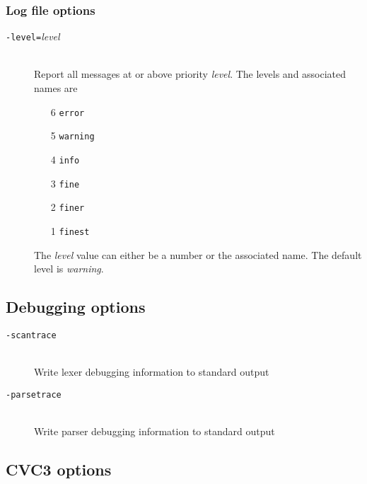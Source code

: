 \documentclass[12pt,fleqn]{article}
\newcommand{\optionb}[1]{\item[\texttt{-{#1}}]\ \\}
\newcommand{\optionv}[2]{\item[\texttt{-{#1}=}\mdseries\textit{#2}]\ \\}
\begin{document}
\subsubsection{Log file options}

\begin{description}
  \optionv{level}{level}  Report all messages at or above 
     priority \textit{level}.  The levels and associated names are
     \begin{enumerate}
     \item [6] \texttt{error}
     \item [5] \texttt{warning}
     \item [4] \texttt{info}
     \item [3] \texttt{fine}
     \item [2] \texttt{finer}
     \item [1] \texttt{finest}
     \end{enumerate}
     The \textit{level} value can either be a number or the associated name.
     The default level is \emph{warning}.

\end{description}

\subsection{Debugging options}
\begin{description}
\optionb{scantrace} Write lexer debugging information to standard output 
\optionb{parsetrace} 
  Write parser debugging information to standard output 
\end{description}

\subsection{CVC3 options}
\end{document}
